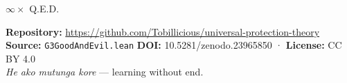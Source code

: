 \bigskip

\begin{center}
{\Large\color{korugreen} $\infty \times$ Q.E.D.}
\end{center}

\bigskip

\noindent\small\textbf{Repository:} \url{https://github.com/Tobillicious/universal-protection-theory}
\textbf{Source:} \texttt{G3GoodAndEvil.lean}
\textbf{DOI:} 10.5281/zenodo.23965850 · \textbf{License:} CC BY 4.0\\[0.5em]
\textit{He ako mutunga kore} — learning without end. 🌿


